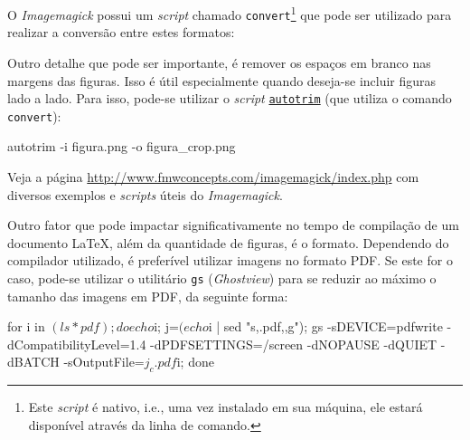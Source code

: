 O \textit{Imagemagick} possui um \textit{script} chamado {\tt convert}\footnote{Este \textit{script} é nativo, i.e., uma vez instalado em sua máquina, ele estará disponível através da linha de comando.} que pode ser utilizado para realizar a conversão entre estes formatos:


Outro detalhe que pode ser importante, é remover os espaços em branco nas margens das figuras. Isso é útil especialmente quando deseja-se incluir figuras lado a lado. Para isso, pode-se utilizar o \textit{script} \href{http://www.fmwconcepts.com/imagemagick/autotrim/index.php}{{\tt autotrim}} (que utiliza o comando {\tt convert}):

\begin{meucomando}
autotrim -i figura.png -o figura_crop.png
\end{meucomando}

\begin{marker}
Veja a página \url{http://www.fmwconcepts.com/imagemagick/index.php} com diversos exemplos e \textit{scripts} úteis do \textit{Imagemagick}.
\end{marker}

Outro fator que pode impactar significativamente no tempo de compilação de um documento \LaTeX{}, além da quantidade de figuras, é o formato. Dependendo do compilador utilizado, é preferível utilizar imagens no formato PDF. Se este for o caso, pode-se utilizar o utilitário {\tt gs} (\textit{Ghostview}) para se reduzir ao máximo o tamanho das imagens em PDF, da seguinte forma:


\begin{meucomando}
for i in $(ls *pdf); do echo $i; j=$(echo $i | sed "s,.pdf,,g"); gs -sDEVICE=pdfwrite -dCompatibilityLevel=1.4 -dPDFSETTINGS=/screen -dNOPAUSE -dQUIET -dBATCH -sOutputFile=${j}_c.pdf $i; done
\end{meucomando}

